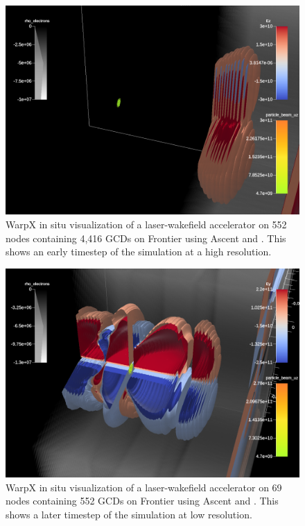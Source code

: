 \begin{figure}[b]
    \centering
    \includegraphics[width=\linewidth]{figures/ez_007050.png}
    \caption{WarpX in situ visualization of a laser-wakefield accelerator on 552 nodes containing 4,416 GCDs on Frontier using Ascent and \vtkm. This shows an early timestep of the simulation at a high resolution.}
    \label{fig:warpx_highres}
\end{figure}

\begin{figure}[b]
    \centering
    \includegraphics[width=\linewidth]{figures/ey_009300.png}
    \caption{WarpX in situ visualization of a laser-wakefield accelerator on 69 nodes containing 552 GCDs on Frontier using Ascent and \vtkm. This shows a later timestep of the simulation at low resolution.}
    \label{fig:warpx_lowres}
\end{figure}

